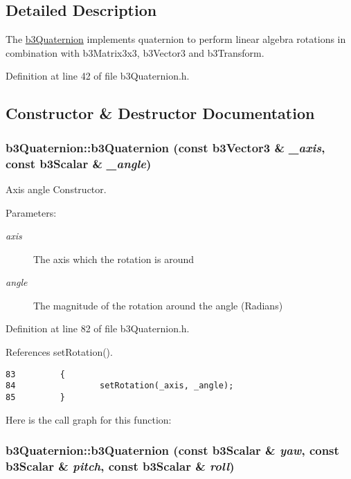 \subsection{Detailed Description}
The \hyperlink{classb3_quaternion}{b3Quaternion} implements quaternion to perform linear algebra rotations in combination with b3Matrix3x3, b3Vector3 and b3Transform. 

Definition at line 42 of file b3Quaternion.h.

\subsection{Constructor \& Destructor Documentation}
\hypertarget{classb3_quaternion_e9b2568fec426fbb4574bdcbd1bad418}{
\subsubsection[b3Quaternion]{\setlength{\rightskip}{0pt plus 5cm}b3Quaternion::b3Quaternion (const b3Vector3 \& {\em \_\-axis}, \/  const b3Scalar \& {\em \_\-angle})}}
\label{classb3_quaternion_e9b2568fec426fbb4574bdcbd1bad418}


Axis angle Constructor. 

\begin{Desc}
\item[Parameters:]
\begin{description}
\item[{\em axis}]The axis which the rotation is around \item[{\em angle}]The magnitude of the rotation around the angle (Radians) \end{description}
\end{Desc}


Definition at line 82 of file b3Quaternion.h.

References setRotation().

\begin{Code}\begin{verbatim}83         { 
84                 setRotation(_axis, _angle); 
85         }
\end{verbatim}
\end{Code}




Here is the call graph for this function:\hypertarget{classb3_quaternion_05b0b4abc7eaf5cb9ba00ea3b2353908}{
\subsubsection[b3Quaternion]{\setlength{\rightskip}{0pt plus 5cm}b3Quaternion::b3Quaternion (const b3Scalar \& {\em yaw}, \/  const b3Scalar \& {\em pitch}, \/  const b3Scalar \& {\em roll})}}
\label{classb3_quaternion_05b0b4abc7eaf5cb9ba00ea3b2353908}


